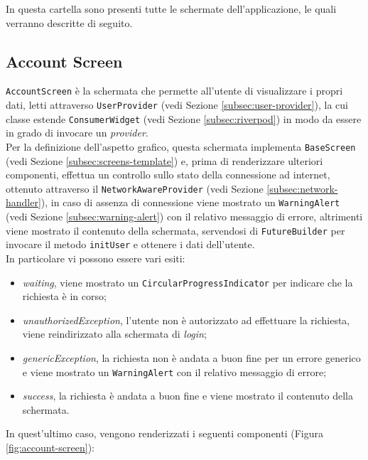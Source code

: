 In questa cartella sono presenti tutte le schermate dell'applicazione, le quali verranno descritte di seguito.

\subsection{Account Screen}
\label{subsec:account-screen}

\lstinline{AccountScreen} è la schermata che permette all'utente di visualizzare i propri dati, letti attraverso \lstinline{UserProvider} (vedi Sezione \ref{subsec:user-provider}), la cui classe estende \lstinline{ConsumerWidget} (vedi Sezione \ref{subsec:riverpod}) in modo da essere in grado di invocare un \emph{provider}. \\
Per la definizione dell'aspetto grafico, questa schermata implementa \lstinline{BaseScreen} (vedi Sezione \ref{subsec:screens-template}) e, prima di renderizzare ulteriori componenti, effettua un controllo sullo stato della connessione ad internet, ottenuto attraverso il \lstinline{NetworkAwareProvider} (vedi Sezione \ref{subsec:network-handler}), in caso di assenza di connessione viene mostrato un \lstinline{WarningAlert} (vedi Sezione \ref{subsec:warning-alert}) con il relativo messaggio di errore, altrimenti viene mostrato il contenuto della schermata, servendosi di \lstinline{FutureBuilder} \cite{site:future-builder} per invocare il metodo \lstinline{initUser} e ottenere i dati dell'utente. \\
In particolare vi possono essere vari esiti:
\begin{itemize}
    \item \emph{waiting}, viene mostrato un \lstinline{CircularProgressIndicator} \cite{site:circular-progress-indicator} per indicare che la richiesta è in corso;
    \item \emph{unauthorizedException}, l'utente non è autorizzato ad effettuare la richiesta, viene reindirizzato alla schermata di \emph{login};
    \item \emph{genericException}, la richiesta non è andata a buon fine per un errore generico e viene mostrato un \lstinline{WarningAlert} con il relativo messaggio di errore;
    \item \emph{success}, la richiesta è andata a buon fine e viene mostrato il contenuto della schermata.
\end{itemize}
In quest'ultimo caso, vengono renderizzati i seguenti componenti (Figura \ref{fig:account-screen}):
